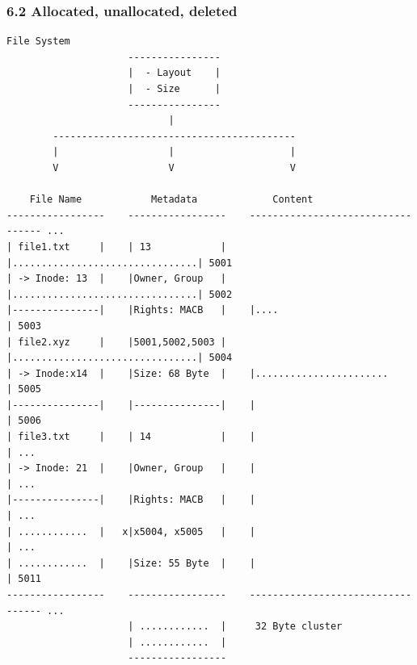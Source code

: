 \begin{frame}[fragile]
  \frametitle{6.2 Allocated, unallocated, deleted}
  \begin{lstlisting}[basicstyle=\tiny\ttfamily]
                       File System
                     ----------------
                     |  - Layout    |
                     |  - Size      |
                     ----------------
                            |
        ------------------------------------------
        |                   |                    |
        V                   V                    V

    File Name            Metadata             Content     
-----------------    -----------------    ---------------------------------- ...
| file1.txt     |    | 13            |    |................................| 5001
| -> Inode: 13  |    |Owner, Group   |    |................................| 5002
|---------------|    |Rights: MACB   |    |....                            | 5003
| file2.xyz     |    |5001,5002,5003 |    |................................| 5004
| -> Inode:x14  |    |Size: 68 Byte  |    |.......................         | 5005
|---------------|    |---------------|    |                                | 5006
| file3.txt     |    | 14            |    |                                | ...
| -> Inode: 21  |    |Owner, Group   |    |                                | ...
|---------------|    |Rights: MACB   |    |                                | ...
| ............  |   x|x5004, x5005   |    |                                | ...
| ............  |    |Size: 55 Byte  |    |                                | 5011
-----------------    -----------------    ---------------------------------- ...
                     | ............  |     32 Byte cluster
                     | ............  |
                     -----------------
  \end{lstlisting}
\end{frame}


